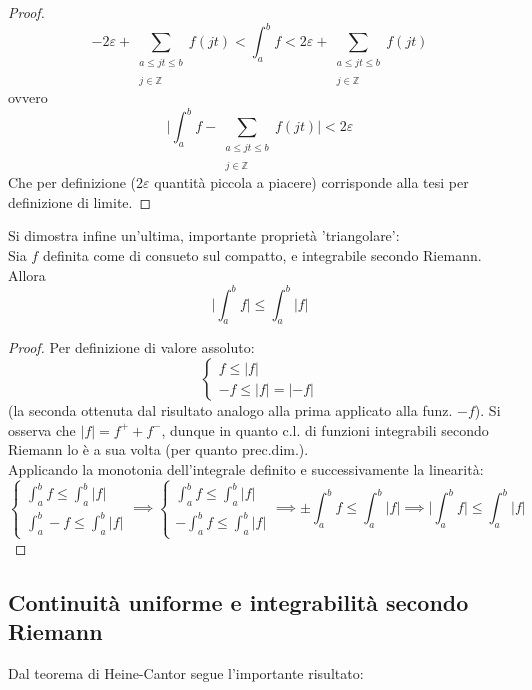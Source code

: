 \documentclass[10pt]{article}
\theoremstyle{plain}
\begin{document}
\begin{proof}
    \[- 2 \varepsilon + \sum_{\substack{a \leq jt \leq b \\~\\ j \in \mathbb{Z}}} f(jt) < \int_a^b f < 2 \varepsilon + \sum_{\substack{a \leq jt \leq b \\~\\ j \in \mathbb{Z}}} f(jt)\]
    ovvero
    \[\big| \int_a^b f -   \sum_{\substack{a \leq jt \leq b \\~\\ j \in \mathbb{Z}}} f(jt) \big| < 2\varepsilon\]
    Che per definizione ($2\varepsilon$ quantità piccola a piacere) corrisponde alla tesi per definizione di limite.
\end{proof}

Si dimostra infine un'ultima, importante proprietà 'triangolare':
\\Sia $f$ definita come di consueto sul compatto, e integrabile secondo Riemann. Allora
\[\boxed{\big|\int_a^b f\big| \leq \int_a^b |f|}\]
\begin{proof}
    Per definizione di valore assoluto:
    \[\begin{cases}
        f \leq |f| \\
        -f \leq |f| = |-f|        
    \end{cases}\]
    (la seconda ottenuta dal risultato analogo alla prima applicato alla funz. $-f$). Si osserva che $|f| = f^+ + f^-$, dunque in quanto c.l. di funzioni integrabili secondo Riemann lo è a sua volta (per quanto prec.dim.).
    \\Applicando la monotonia dell'integrale definito e successivamente la linearità:
    \[\begin{cases}
        \int_a^b f \leq \int_a^b |f| \\
        \int_a^b -f \leq \int_a^b |f|       
    \end{cases} \implies \begin{cases}
        \int_a^b f \leq \int_a^b |f| \\
        - \int_a^b f \leq \int_a^b |f|       
    \end{cases} \implies \pm  \int_a^b f \leq \int_a^b |f| \implies \big|\int_a^b f\big| \leq \int_a^b |f|\]
\end{proof}

\subsection{Continuità uniforme e integrabilità secondo Riemann}
Dal teorema di Heine-Cantor segue l'importante risultato:
\end{document}
